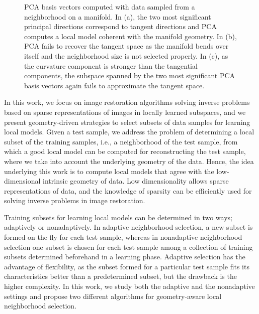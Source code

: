 \documentclass[journal]{IEEEtran}
\begin{document}
\begin{figure*}[!t]
\begin{center}
 \end{center}
 \caption{PCA basis vectors computed with data sampled from a neighborhood on a manifold. In (a), the two most significant principal directions correspond to tangent directions and PCA computes a local model coherent with the manifold geometry. In (b), PCA fails to recover the tangent space as the manifold bends over itself and the neighborhood size is not selected properly. In (c), as the curvature component is stronger than the tangential components, the subspace spanned by the two most significant PCA basis vectors again fails to approximate the tangent space.}
 \label{fig:illus_pca}
\end{figure*}

In this work, we focus on image restoration algorithms solving inverse problems based on sparse representations of images in locally learned subspaces, and we present geometry-driven strategies to select subsets of data samples for learning local models. Given a test sample, we address the problem of determining a local subset of the training samples, i.e., a neighborhood of the test sample, from which a good local model can be computed for reconstructing the test sample, where we take into account the underlying geometry of the data. Hence, the idea underlying this work is to compute local models that agree with the low-dimensional intrinsic geometry of data.  Low dimensionality allows sparse representations of data, and the knowledge of sparsity  can be efficiently used  for solving inverse problems in image restoration.

Training subsets for learning local models can be determined in two ways; adaptively or nonadaptively. In adaptive neighborhood selection, a new subset is formed on the fly for each test sample, whereas in nonadaptive neighborhood selection one subset is chosen for each test sample among a collection of training subsets determined beforehand in a learning phase. Adaptive selection has the advantage of flexibility, as the subset formed for a particular test sample fits its characteristics better than a predetermined subset, but the drawback is the higher complexity.
In this work, we study both the adaptive and the nonadaptive settings and propose two different algorithms for geometry-aware local neighborhood selection.
\end{document}
